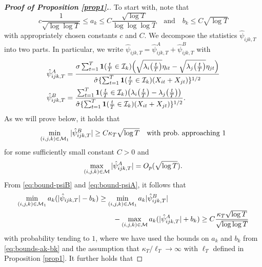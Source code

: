 \documentclass[a4paper,12pt]{article}
\numberwithin{equation}{section}
\begin{document}
{\begin{proof}[\textnormal{\textbf{Proof of Proposition \ref{prop1}.}}]
To start with, note that 
\begin{equation}\label{eq:bounds-ak-bk}
c\frac{1}{\sqrt{\log \log T}}  \le a_k \le C\frac{\sqrt{\log T}}{\log \log \log T} \quad \text{and} \quad b_k \le C \sqrt{\log T}
\end{equation}
with appropriately chosen constants $c$ and $C$. We decompose the statistics $\hat{\psi}_{ijk, T}$ into two parts. In particular, we write $\hat{\psi}_{ijk, T} = \hat{\psi}_{ijk, T}^A + \hat{\psi}_{ijk, T}^B$ with
\begin{align*} 
\hat{\psi}_{ijk, T}^A & = \frac{\sigma \sum\nolimits_{t=1}^T \boldsymbol{1}(\frac{t}{T} \in \mathcal{I}_k) \Big(\sqrt{\lambda_{i}\big(\frac{t}{T}\big)} \eta_{it} - \sqrt{\lambda_{j}\big(\frac{t}{T}\big)}\eta_{jt}\Big)}{ \hat{\sigma} \{ \sum\nolimits_{t=1}^T \boldsymbol{1}(\frac{t}{T} \in \mathcal{I}_k) (X_{it} + X_{jt}) \}^{1/2}} \\
\hat{\psi}_{ijk, T}^B & = \frac{\sum\nolimits_{t=1}^T \boldsymbol{1}(\frac{t}{T} \in \mathcal{I}_k) \big(\lambda_{i}\big(\frac{t}{T}\big) - \lambda_{j}\big(\frac{t}{T}\big)\big)}{ \hat{\sigma} \{ \sum\nolimits_{t=1}^T \boldsymbol{1}(\frac{t}{T} \in \mathcal{I}_k) (X_{it} + X_{jt}) \}^{1/2}}.
\end{align*}
As we will prove below, it holds that 
\begin{equation}\label{eq:bound-psiB}
\min_{(i,j,k) \in \mathcal{M}_1} |\hat{\psi}_{ijk, T}^B| \ge C \kappa_T \sqrt{\log T} \quad \text{with prob.\ approaching } 1
\end{equation}
for some sufficiently small constant $C > 0$ and 
\begin{equation}\label{eq:bound-psiA}
\max_{(i,j,k) \in \mathcal{M}} |\hat{\psi}_{ijk, T}^A| = O_p(\sqrt{\log T}). 
\end{equation}
From \eqref{eq:bound-psiB} and \eqref{eq:bound-psiA}, it follows that  
\begin{align}
\min_{(i,j,k) \in \mathcal{M}_1} a_k (|\hat{\psi}_{ijk,T}| - b_k) 
 & \ge \min_{(i, j, k) \in \mathcal{M}_1} a_k |\hat{\psi}_{ijk, T}^B| \nonumber \\ & \qquad - \max_{(i, j, k) \in \mathcal{M}} a_k (|\hat{\psi}_{ijk, T}^A| + b_k) 
   \ge C \frac{\kappa_T \sqrt{\log T}}{\sqrt{\log \log T}} \label{eq:bound-psi}
\end{align}
with probability tending to $1$, where we have used the bounds on $a_k$ and $b_k$ from \eqref{eq:bounds-ak-bk} and the assumption that $\kappa_T/\ell_T \to \infty$ with $\ell_T$ defined in Proposition \ref{prop1}. It further holds that 

\end{proof}}
\end{document}
